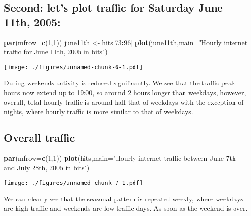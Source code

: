 \documentclass[]{article}
\newenvironment{Shaded}{\begin{snugshade}}{\end{snugshade}}
\newcommand{\DataTypeTok}[1]{\textcolor[rgb]{0.13,0.29,0.53}{#1}}
\newcommand{\DecValTok}[1]{\textcolor[rgb]{0.00,0.00,0.81}{#1}}
\newcommand{\KeywordTok}[1]{\textcolor[rgb]{0.13,0.29,0.53}{\textbf{#1}}}
\newcommand{\NormalTok}[1]{#1}
\newcommand{\OperatorTok}[1]{\textcolor[rgb]{0.81,0.36,0.00}{\textbf{#1}}}
\newcommand{\StringTok}[1]{\textcolor[rgb]{0.31,0.60,0.02}{#1}}
\begin{document}
\newpage

\hypertarget{second-lets-plot-traffic-for-saturday-june-11th-2005}{%
\subsection{Second: let's plot traffic for Saturday June 11th,
2005:}\label{second-lets-plot-traffic-for-saturday-june-11th-2005}}

\begin{Shaded}
\begin{Highlighting}[]
\KeywordTok{par}\NormalTok{(}\DataTypeTok{mfrow=}\KeywordTok{c}\NormalTok{(}\DecValTok{1}\NormalTok{,}\DecValTok{1}\NormalTok{))}
\NormalTok{june11th <-}\StringTok{ }\NormalTok{hits[}\DecValTok{73}\OperatorTok{:}\DecValTok{96}\NormalTok{]}
\KeywordTok{plot}\NormalTok{(june11th,}\DataTypeTok{main=}\StringTok{"Hourly internet traffic for June 11th, 2005 in bits"}\NormalTok{)}
\end{Highlighting}
\end{Shaded}

\texttt{[image: ./figures/unnamed-chunk-6-1.pdf]}

During weekends activity is reduced significantly. We see that the
traffic peak hours now extend up to 19:00, so around 2 hours longer than
weekdays, however, overall, total hourly traffic is around half that of
weekdays with the exception of nights, where hourly traffic is more
similar to that of weekdays.

\newpage

\hypertarget{overall-traffic}{%
\subsection{Overall traffic}\label{overall-traffic}}

\begin{Shaded}
\begin{Highlighting}[]
\KeywordTok{par}\NormalTok{(}\DataTypeTok{mfrow=}\KeywordTok{c}\NormalTok{(}\DecValTok{1}\NormalTok{,}\DecValTok{1}\NormalTok{))}
\KeywordTok{plot}\NormalTok{(hits,}\DataTypeTok{main=}\StringTok{"Hourly internet traffic between June 7th and July 28th, 2005 in bits"}\NormalTok{)}
\end{Highlighting}
\end{Shaded}

\texttt{[image: ./figures/unnamed-chunk-7-1.pdf]}

We can clearly see that the seasonal pattern is repeated weekly, where
weekdays are high traffic and weekends are low traffic days. As soon as
the weekend is over.
\end{document}
